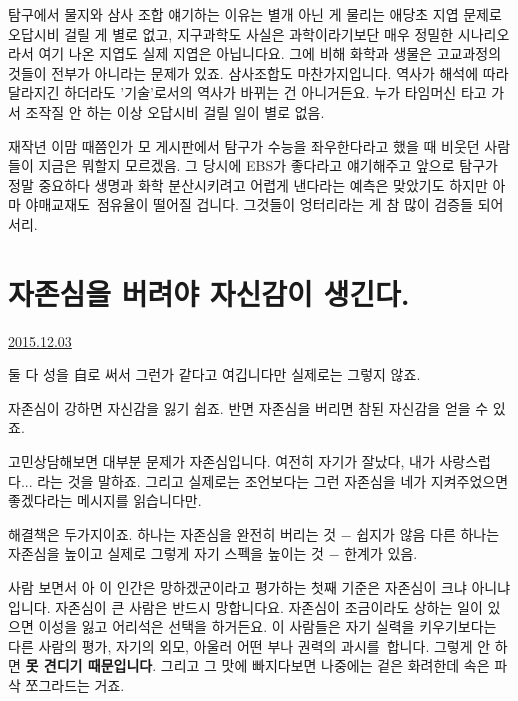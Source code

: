 탐구에서 물지와 삼사 조합 얘기하는 이유는 별개 아닌 게
물리는 애당초 지엽 문제로 오답시비 걸릴 게 별로 없고,
지구과학도 사실은 과학이라기보단 매우 정밀한 시나리오라서 여기 나온 지엽도 실제 지엽은 아닙니다요.
그에 비해 화학과 생물은 고교과정의 것들이 전부가 아니라는 문제가 있죠.
삼사조합도 마찬가지입니다. 역사가 해석에 따라 달라지긴 하더라도 '기술'로서의 역사가 바뀌는 건 아니거든요.
누가 타임머신 타고 가서 조작질 안 하는 이상 오답시비 걸릴 일이 별로 없음.
\vspace{5mm}

재작년 이맘 때쯤인가 모 게시판에서 탐구가 수능을 좌우한다라고 했을 때 비웃던 사람들이 지금은 뭐할지 모르겠음.
그 당시에 EBS가 좋다라고 얘기해주고 앞으로 탐구가 정말 중요하다 생명과 화학 분산시키려고 어렵게 낸다라는 예측은 맞았기도 하지만
아마 야매교재도 점유율이 떨어질 겁니다. 그것들이 엉터리라는 게 참 많이 검증들 되어서리.
\vspace{5mm}







\section{자존심을 버려야 자신감이 생긴다.}
\href{https://www.kockoc.com/Apoc/524793}{2015.12.03}

\vspace{5mm}

둘 다 성을 自로 써서 그런가 같다고 여깁니다만 실제로는 그렇지 않죠.
\vspace{5mm}

자존심이 강하면 자신감을 잃기 쉽죠.
반면 자존심을 버리면 참된 자신감을 얻을 수 있죠.
\vspace{5mm}

고민상담해보면 대부분 문제가 자존심입니다.
여전히 자기가 잘났다, 내가 사랑스럽다... 라는 것을 말하죠.
그리고 실제로는 조언보다는 그런 자존심을 네가 지켜주었으면 좋겠다라는 메시지를 읽습니다만.
\vspace{5mm}

해결책은 두가지이죠.
하나는 자존심을 완전히 버리는 것 $-$ 쉽지가 않음
다른 하나는 자존심을 높이고 실제로 그렇게 자기 스펙을 높이는 것 $-$ 한계가 있음.
\vspace{5mm}

사람 보면서 아 이 인간은 망하겠군이라고 평가하는 첫째 기준은 자존심이 크냐 아니냐 입니다.
자존심이 큰 사람은 반드시 망합니다요. 자존심이 조금이라도 상하는 일이 있으면 이성을 잃고 어리석은 선택을 하거든요.
이 사람들은 자기 실력을 키우기보다는 다른 사람의 평가, 자기의 외모, 아울러 어떤 부나 권력의 과시를 합니다.
그렇게 안 하면 \textbf{못 견디기 때문입니다}. 그리고 그 맛에 빠지다보면 나중에는 겉은 화려한데 속은 파삭 쪼그라드는 거죠.
\vspace{5mm}

